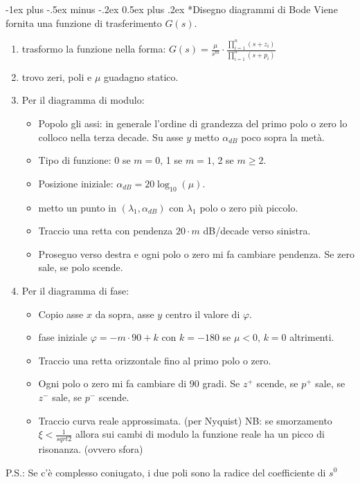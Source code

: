 \documentclass[10pt,landscape, a4paper]{scrartcl} %
\makeatletter
\renewcommand{\section}{\@startsection{section}{1}{0mm}%
                                {-1ex plus -.5ex minus -.2ex}%
                                {0.5ex plus .2ex}%
                                {\normalfont\large\bfseries}}
\makeatother
\begin{document}
\begin{multicols*}{3}
\section*{Disegno diagrammi di Bode}
Viene fornita una funzione di trasferimento $G(s)$.
\begin{enumerate}
	\item trasformo la funzione nella forma: $G(s) = \frac{\mu}{s^m}\cdot \frac{\prod_{i=1}^{n} (s + z_i)}{\prod_{i=1}^{n} (s + p_i)}$
	\item trovo zeri, poli e $\mu$ guadagno statico.
	\item Per il diagramma di modulo:
		\begin{itemize}
			\item Popolo gli assi: in generale l'ordine di grandezza del primo polo o zero lo colloco nella terza decade. Su asse $y$ metto $\alpha_{dB}$ poco sopra la metà.
			\item Tipo di funzione: 0 se $m = 0$, 1 se $m = 1$, 2 se $m \geq 2$.
			\item Posizione iniziale: $\alpha_{dB} = 20\log_{10} (\mu)$.
			\item metto un punto in $(\lambda_1, \alpha_{dB})$ con $\lambda_1$ polo o zero più piccolo.
			\item Traccio una retta con pendenza $20\cdot m$ dB/decade verso sinistra.
			\item Proseguo verso destra e ogni polo o zero mi fa cambiare pendenza. Se zero sale, se polo scende.
		\end{itemize}
	\item Per il diagramma di fase:
		\begin{itemize}
			\item Copio asse $x$ da sopra, asse $y$ centro il valore di $\varphi$.
			\item fase iniziale $\varphi = - m \cdot 90 + k$ con $k = -180$ se $\mu < 0$, $k = 0$ altrimenti.
			\item Traccio una retta orizzontale fino al primo polo o zero.
			\item Ogni polo o zero mi fa cambiare di $90$ gradi. Se $z^+$ scende, se $p^+$ sale, se $z^-$ sale, se $p^-$ scende.
			\item Traccio curva reale approssimata. (per Nyquist)
					NB: se smorzamento $\xi < \frac{1}{sqrt{2}}$ allora sui cambi di modulo la funzione reale ha un picco di risonanza. (ovvero sfora)
		\end{itemize}
\end{enumerate}
P.S.: Se c'è complesso coniugato, i due poli sono la radice del coefficiente di $s^0$


\end{multicols*}
\end{document}
